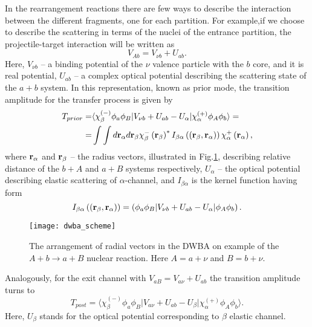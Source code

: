 \documentclass[
12pt, %
oneside, %
english, %
onehalfspacing, %
onehalfspacing, %
headsepline, %
]{MastersDoctoralThesis} %
\begin{document}
In the rearrangement reactions there are few ways to describe the interaction between the different fragments, one for each partition. 
For example,if we choose to describe the scattering in terms of the nuclei of the entrance partition, the projectile-target interaction will be written as
\begin{equation}
V_{Ab}=V_{\nu b} + U_{ab}.
\end{equation}
Here, $V_{\nu b}$ -- a binding potential of the $\nu$ valence particle with the $b$ core, and it is real potential, $U_{ab}$ -- a complex optical potential describing the scattering state of the $a+b$ system.  
In this representation, known as prior mode, the transition amplitude for the transfer process is given by
 \begin{align}
 T_{prior} =& \langle \chi_\beta^{(-)} \phi_a \phi_B  \vert
  V_{\nu b}+U_{ab}-U_{\alpha} \vert
   \chi_\alpha^{(+)} \phi_A \phi_b \rangle = 
   \nonumber \\
= & \int \int d {\bf r}_\alpha  d {\bf r}_\beta
\chi^{-}_\beta \left( {\bf r}_\beta \right)^* 
I_{\beta \alpha}  \left( \left( {\bf r}_\beta ,  {\bf r}_\alpha \right) \right)
\chi^{+}_\alpha \left( {\bf r}_\alpha \right),
 \end{align}
where ${\bf r}_\alpha$ and ${\bf r}_\beta$ -- the radius vectors, illustrated in Fig.\ref{fig:dwba_scheme}, describing relative distance of the $b+A$ and $a+B$ systems respectively,  $U_\alpha$ -- the optical potential describing elastic scattering of $\alpha$-channel, and $I_{\beta \alpha}$ is the kernel function having form
\begin{equation}
I_{\beta \alpha}  \left( \left( {\bf r}_\beta ,  {\bf r}_\alpha \right) \right) =
\left( \phi_a \phi_B  \vert 
 V_{\nu b}+U_{ab}-U_{\alpha} \vert
 \phi_A \phi_b  \right).
\end{equation}
 
\begin{figure}[tp]
\centering
\texttt{[image: dwba\_scheme]}
\decoRule
\caption{ \footnotesize The arrangement of radial vectors in the DWBA 
on example of the $A+b \rightarrow a + B$ nuclear reaction. Here $A=a+\nu$ 
and $B=b+\nu$. }
\label{fig:dwba_scheme}
\end{figure} 
 
 Analogously, for the exit channel with $V_{aB}= V_{a \nu}+U_{ab}$ the transition amplitude turns to
\begin{equation}
T_{post}=  \langle \chi_\beta^{(-)} \phi_a \phi_B  \vert
  V_{a \nu}+U_{ab}-U_{\beta} \vert
   \chi_\alpha^{(+)} \phi_A \phi_b \rangle.
\end{equation}
Here, $U_\beta$ stands for the optical potential corresponding to $\beta$ elastic channel. 
 
\end{document}
